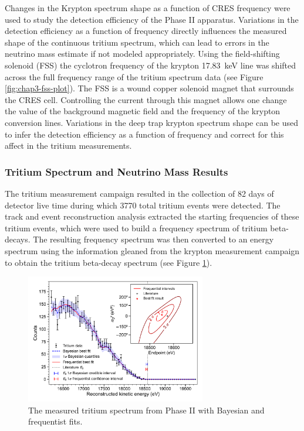 Changes in the Krypton spectrum shape as a function of CRES frequency were used to study the detection efficiency of the Phase II apparatus. Variations in the detection efficiency as a function of frequency directly influences the measured shape of the continuous tritium spectrum, which can lead to errors in the neutrino mass estimate if not modeled appropriately. Using the field-shifting solenoid (FSS) the cyclotron frequency of the krypton 17.83~keV line was shifted across the full frequency range of the tritium spectrum data (see Figure \ref{fig:chap3-fss-plot}). The FSS is a wound copper solenoid magnet that surrounds the CRES cell. Controlling the current through this magnet allows one change the value of the background magnetic field and the frequency of the krypton conversion lines. Variations in the deep trap krypton spectrum shape can be used to infer the detection efficiency as a function of frequency and correct for this affect in the tritium measurements.

\subsubsection*{Tritium Spectrum and Neutrino Mass Results}

The tritium measurement campaign resulted in the collection of 82 days of detector live time during which 3770 total tritium events were detected. The track and event reconstruction analysis extracted the starting frequencies of these tritium events, which were used to build a frequency spectrum of tritium beta-decays. The resulting frequency spectrum was then converted to an energy spectrum using the information gleaned from the krypton measurement campaign to obtain the tritium beta-decay spectrum (see Figure \ref{fig:chap3-final-tritium-fit}).
\begin{figure}
    \centering
    \includegraphics[width=0.7\textwidth]{figs/Chapter-3/12-03-22A_final_E0_real_data_phase_II_tritium_fit_1d.pdf}
    \caption{The measured tritium spectrum from Phase II with Bayesian and frequentist fits.}
    \label{fig:chap3-final-tritium-fit}
\end{figure}

